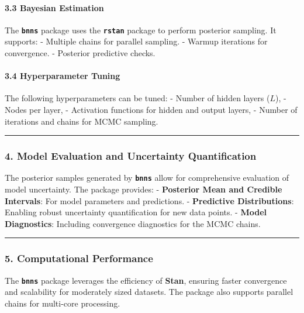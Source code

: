 \documentclass[
]{jss}
\begin{document}
\paragraph{3.3 Bayesian Estimation}\label{bayesian-estimation}

The \textbf{\texttt{bnns}} package uses the \textbf{\texttt{rstan}}
package to perform posterior sampling. It supports: - Multiple chains
for parallel sampling. - Warmup iterations for convergence. - Posterior
predictive checks.

\paragraph{3.4 Hyperparameter Tuning}\label{hyperparameter-tuning}

The following hyperparameters can be tuned: - Number of hidden layers
(\(L\)), - Nodes per layer, - Activation functions for hidden and output
layers, - Number of iterations and chains for MCMC sampling.

\begin{center}\rule{0.5\linewidth}{0.5pt}\end{center}

\subsubsection{4. Model Evaluation and Uncertainty
Quantification}\label{model-evaluation-and-uncertainty-quantification}

The posterior samples generated by \textbf{\texttt{bnns}} allow for
comprehensive evaluation of model uncertainty. The package provides: -
\textbf{Posterior Mean and Credible Intervals}: For model parameters and
predictions. - \textbf{Predictive Distributions}: Enabling robust
uncertainty quantification for new data points. - \textbf{Model
Diagnostics}: Including convergence diagnostics for the MCMC chains.

\begin{center}\rule{0.5\linewidth}{0.5pt}\end{center}

\subsubsection{5. Computational
Performance}\label{computational-performance}

The \textbf{\texttt{bnns}} package leverages the efficiency of
\textbf{Stan}, ensuring faster convergence and scalability for
moderately sized datasets. The package also supports parallel chains for
multi-core processing.
\end{document}
